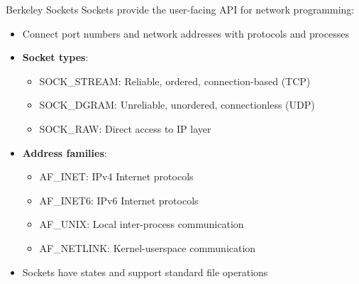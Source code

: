 \begin{definition}{Berkeley Sockets}
    Sockets provide the user-facing API for network programming:
    \begin{itemize}
        \item Connect port numbers and network addresses with protocols and processes
        \item \textbf{Socket types}:
            \begin{itemize}
                \item SOCK\_STREAM: Reliable, ordered, connection-based (TCP)
                \item SOCK\_DGRAM: Unreliable, unordered, connectionless (UDP)
                \item SOCK\_RAW: Direct access to IP layer
            \end{itemize}
        \item \textbf{Address families}:
            \begin{itemize}
                \item AF\_INET: IPv4 Internet protocols
                \item AF\_INET6: IPv6 Internet protocols
                \item AF\_UNIX: Local inter-process communication
                \item AF\_NETLINK: Kernel-userspace communication
            \end{itemize}
        \item Sockets have states and support standard file operations
    \end{itemize}
\end{definition}

